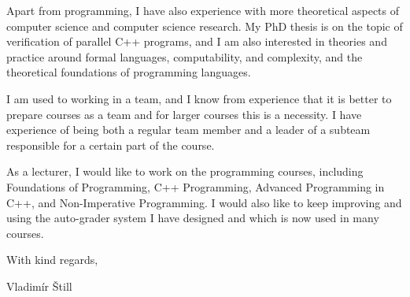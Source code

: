 \documentclass[11pt,a4paper]{article}
\begin{document}
Apart from programming, I have also experience with more theoretical aspects of computer science and computer science research.
My PhD thesis is on the topic of verification of parallel C++ programs, and I am also interested in theories and practice around formal languages, computability, and complexity, and the theoretical foundations of programming languages.

I am used to working in a team, and I know from experience that it is better to prepare courses as a team and for larger courses this is a necessity.
I have experience of being both a regular team member and a leader of a subteam responsible for a certain part of the course.

As a lecturer, I would like to work on the programming courses, including Foundations of Programming, C++ Programming, Advanced Programming in C++, and Non-Imperative Programming.
I would also like to keep improving and using the auto-grader system I have designed and which is now used in many courses.

\smallskip
With kind regards,\par
Vladimír Štill
\end{document}
